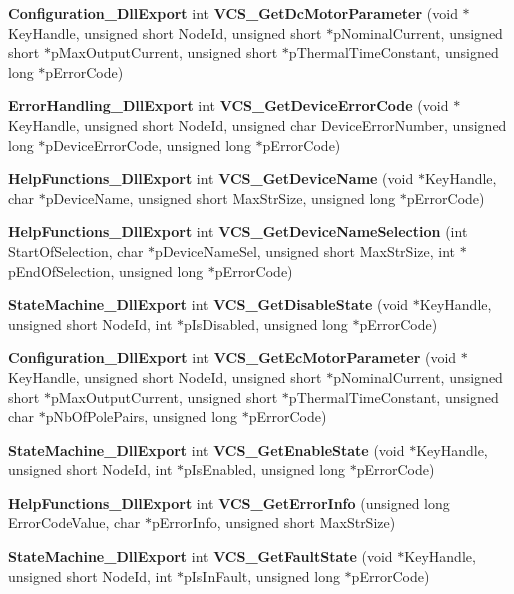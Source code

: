 \begin{DoxyCompactItemize}
{\bf \-Configuration\-\_\-\-Dll\-Export} int {\bf \-V\-C\-S\-\_\-\-Get\-Dc\-Motor\-Parameter} (void $\ast$\-Key\-Handle, unsigned short \-Node\-Id, unsigned short $\ast$p\-Nominal\-Current, unsigned short $\ast$p\-Max\-Output\-Current, unsigned short $\ast$p\-Thermal\-Time\-Constant, unsigned long $\ast$p\-Error\-Code)
\item 
{\bf \-Error\-Handling\-\_\-\-Dll\-Export} int {\bf \-V\-C\-S\-\_\-\-Get\-Device\-Error\-Code} (void $\ast$\-Key\-Handle, unsigned short \-Node\-Id, unsigned char \-Device\-Error\-Number, unsigned long $\ast$p\-Device\-Error\-Code, unsigned long $\ast$p\-Error\-Code)
\item 
{\bf \-Help\-Functions\-\_\-\-Dll\-Export} int {\bf \-V\-C\-S\-\_\-\-Get\-Device\-Name} (void $\ast$\-Key\-Handle, char $\ast$p\-Device\-Name, unsigned short \-Max\-Str\-Size, unsigned long $\ast$p\-Error\-Code)
\item 
{\bf \-Help\-Functions\-\_\-\-Dll\-Export} int {\bf \-V\-C\-S\-\_\-\-Get\-Device\-Name\-Selection} (int \-Start\-Of\-Selection, char $\ast$p\-Device\-Name\-Sel, unsigned short \-Max\-Str\-Size, int $\ast$p\-End\-Of\-Selection, unsigned long $\ast$p\-Error\-Code)
\item 
{\bf \-State\-Machine\-\_\-\-Dll\-Export} int {\bf \-V\-C\-S\-\_\-\-Get\-Disable\-State} (void $\ast$\-Key\-Handle, unsigned short \-Node\-Id, int $\ast$p\-Is\-Disabled, unsigned long $\ast$p\-Error\-Code)
\item 
{\bf \-Configuration\-\_\-\-Dll\-Export} int {\bf \-V\-C\-S\-\_\-\-Get\-Ec\-Motor\-Parameter} (void $\ast$\-Key\-Handle, unsigned short \-Node\-Id, unsigned short $\ast$p\-Nominal\-Current, unsigned short $\ast$p\-Max\-Output\-Current, unsigned short $\ast$p\-Thermal\-Time\-Constant, unsigned char $\ast$p\-Nb\-Of\-Pole\-Pairs, unsigned long $\ast$p\-Error\-Code)
\item 
{\bf \-State\-Machine\-\_\-\-Dll\-Export} int {\bf \-V\-C\-S\-\_\-\-Get\-Enable\-State} (void $\ast$\-Key\-Handle, unsigned short \-Node\-Id, int $\ast$p\-Is\-Enabled, unsigned long $\ast$p\-Error\-Code)
\item 
{\bf \-Help\-Functions\-\_\-\-Dll\-Export} int {\bf \-V\-C\-S\-\_\-\-Get\-Error\-Info} (unsigned long \-Error\-Code\-Value, char $\ast$p\-Error\-Info, unsigned short \-Max\-Str\-Size)
\item 
{\bf \-State\-Machine\-\_\-\-Dll\-Export} int {\bf \-V\-C\-S\-\_\-\-Get\-Fault\-State} (void $\ast$\-Key\-Handle, unsigned short \-Node\-Id, int $\ast$p\-Is\-In\-Fault, unsigned long $\ast$p\-Error\-Code)

\end{DoxyCompactItemize}
